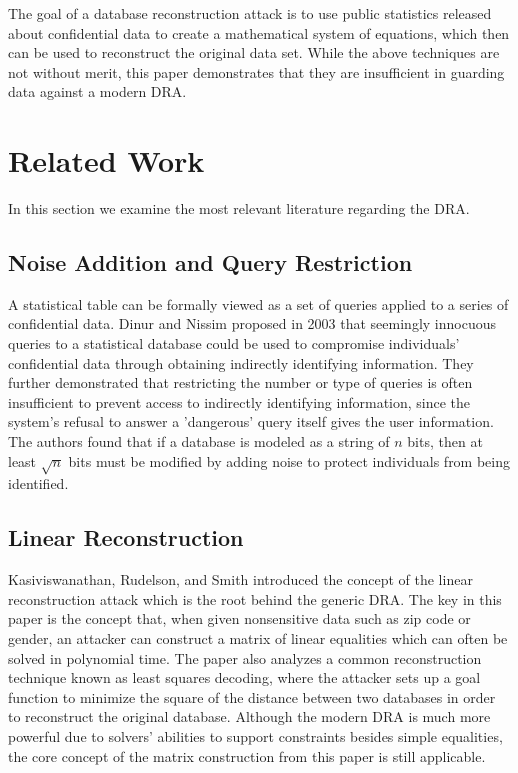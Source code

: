 \documentclass[5p,times,11pt]{elsarticle}
\begin{document}
The goal of a database reconstruction attack is to
use public statistics released about confidential data to create a mathematical system of equations,
which then can be used to reconstruct the original data set.
While the above techniques are not without merit, this paper
demonstrates that they are insufficient in guarding data against
a modern DRA.

\section{Related Work}


In this section we examine the most relevant literature regarding the DRA.

\subsection{Noise Addition and Query Restriction}
A statistical table can be formally viewed as a set of queries applied to a series of confidential data. Dinur and Nissim \cite{noise} proposed in 2003 that seemingly innocuous queries to a statistical database could be used to compromise individuals' confidential data through obtaining indirectly identifying information. They further demonstrated that restricting the number or type of queries is often insufficient to prevent access to indirectly identifying information, since the system's refusal to answer a 'dangerous' query itself gives the user information. The authors found that if a database is modeled as a string of $n$ bits, then at least $\sqrt{n}$ bits must be modified by adding noise to protect individuals from being identified.


\subsection{Linear Reconstruction}

Kasiviswanathan, Rudelson, and Smith \cite{linearattack} introduced the concept of the linear reconstruction attack which is the root behind the generic DRA. The key in this paper is the concept that, when given nonsensitive data such as zip code or gender, an attacker can construct a matrix of linear equalities which can often be solved in polynomial time. The paper also analyzes a common reconstruction technique known as least squares decoding, where the attacker sets up a goal function to minimize the square of the distance between two databases in order to reconstruct the original database. Although the modern DRA is much more powerful due to solvers' abilities to support constraints besides simple equalities, the core concept of the matrix construction from this paper is still applicable.
\end{document}
